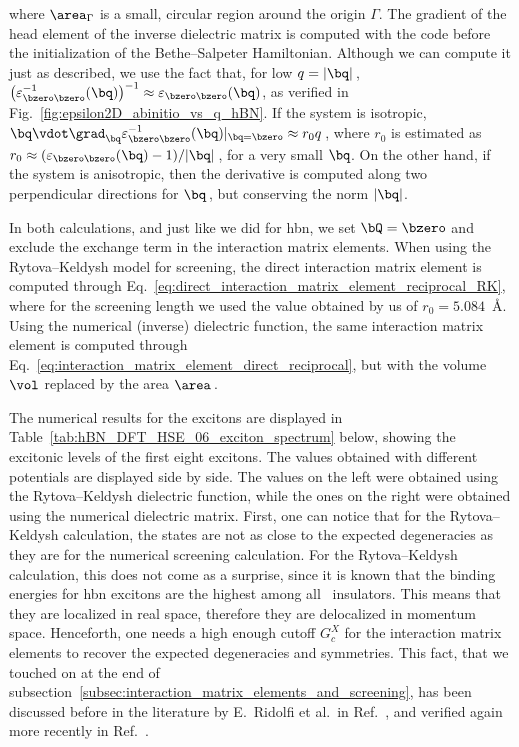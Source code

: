 \noindent where $\area_{\Gamma}$ is a small, circular region around the origin $\Gamma$.
The gradient of the head element of the inverse dielectric matrix is computed with the code before the initialization of the Bethe--Salpeter Hamiltonian.
Although we can compute it just as described, we use the fact that, for low $q=|\bq|$\,, $\big(\varepsilon^{-1}_{\bzero \bzero} (\bq) \big)^{-1} \approx \varepsilon_{\bzero \bzero} (\bq)$, as verified in Fig.~\ref{fig:epsilon2D_abinitio_vs_q_hBN}.
If the system is isotropic, $\bq \vdot \mathbf{\grad}_{\bq} \varepsilon^{-1}_{\bzero \bzero} (\bq)|_{\bq = \bzero} \approx r_0 q$\,, where $r_0$ is estimated as $r_0 \approx (\varepsilon_{\bzero \bzero} (\bq) - 1)/|\bq|$\,, for a very small $\bq$.
On the other hand, if the system is anisotropic, then the derivative is computed along two perpendicular directions for $\bq$\,, but conserving the norm $|\bq|$.

In both calculations, and just like we did for \gls{hbn}, we set $\bQ=\bzero$ and exclude the exchange term in the interaction matrix elements.
When using the Rytova--Keldysh model for screening, the direct interaction matrix element is computed through Eq.~\eqref{eq:direct_interaction_matrix_element_reciprocal_RK}, where for the screening length we used the value obtained by us of $r_0 = 5.084$~\unit{\angstrom}.
Using the numerical (inverse) dielectric function, the same interaction matrix element is computed through Eq.~\eqref{eq:interaction_matrix_element_direct_reciprocal}, but with the volume $\vol$ replaced by the area $\area$\,.

The numerical results for the excitons are displayed in Table~\ref{tab:hBN_DFT_HSE_06_exciton_spectrum} below, showing the excitonic levels of the first eight excitons.
The values obtained with different potentials are displayed side by side.
The values on the left were obtained using the Rytova--Keldysh dielectric function, while the ones on the right were obtained using the numerical dielectric matrix.
First, one can notice that for the Rytova--Keldysh calculation, the states are not as close to the expected degeneracies as they are for the numerical screening calculation.
For the Rytova--Keldysh calculation, this does not come as a surprise, since it is known that the binding energies for \gls{hbn} excitons are the highest among all \bd~insulators.
This means that they are localized in real space, therefore they are delocalized in momentum space.
Henceforth, one needs a high enough cutoff $G^{X}_c$ for the interaction matrix elements to recover the expected degeneracies and symmetries.
This fact, that we touched on at the end of subsection~\ref{subsec:interaction_matrix_elements_and_screening}, has been discussed before in the literature by E.~Ridolfi et al.~in Ref.~\cite{Ridolfi_2015}, and verified again more recently in Ref.~\cite{Xatu}.

